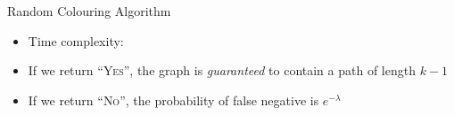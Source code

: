 \begin{theorem}[]{Random Colouring Algorithm}
    \begin{itemize}
        \item Time complexity: 
        \item If we return ``\textsc{Yes}'', the graph is \textit{guaranteed} to contain a path of length $k - 1$
        \item If we return ``\textsc{No}'', the probability of false negative is $e^{-\lambda}$
    \end{itemize}
\end{theorem}
